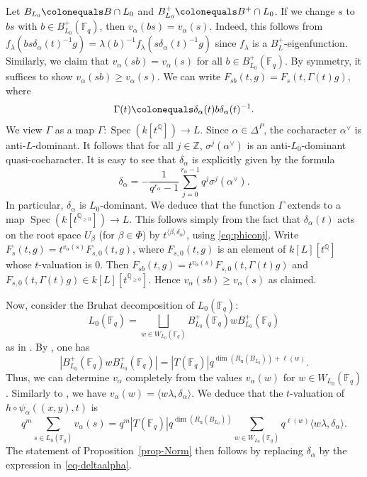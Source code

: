 \documentclass[11pt]{amsart}
\numberwithin{equation}{section}
\theoremstyle{definition}
\theoremstyle{remark}
\newcommand{\FF}{\mathbb{F}}
\newcommand{\QQ}{\mathbb{Q}}
\newcommand{\ZZ}{\mathbb{Z}}
\DeclareMathOperator{\spec}{Spec}
\begin{document}
Let $B_{L_0}\colonequals B\cap L_0$ and $B^+_{L_0}\colonequals B^+\cap L_0$. If we change $s$ to $bs$ with $b\in B^{+}_{L_0}(\FF_q)$, then $v_\alpha(bs)=v_\alpha(s)$. Indeed, this follows from $f_\lambda(bs\delta_\alpha(t)^{-1}g)=\lambda(b)^{-1} f_\lambda(s\delta_\alpha(t)^{-1}g)$ since $f_\lambda$ is a $B^+_L$-eigenfunction. Similarly, we claim that $v_\alpha(sb)=v_\alpha(s)$ for all $b\in B^+_{L_0}(\FF_q)$. By symmetry, it suffices to show $v_\alpha(sb)\geq v_\alpha(s)$. We can write
$F_{sb}(t,g)=F_s(t,\Gamma(t)g)$, where
\begin{equation}
    \Gamma(t)\colonequals
    \delta_\alpha(t) b \delta_\alpha(t)^{-1}.
\end{equation}
We view $\Gamma$ as a map $\Gamma\colon \spec(k[t^\QQ])\to L$. Since $\alpha\in \Delta^P$, the cocharacter $\alpha^\vee$ is anti-$L$-dominant. It follows that for all $j\in \ZZ$, $\sigma^j(\alpha^\vee)$ is an anti-$L_0$-dominant quasi-cocharacter. It is easy to see that $\delta_\alpha$ is explicitly given by the formula
\begin{equation}\label{eq-deltaalpha}
    \delta_\alpha=-\frac{1}{q^{r_\alpha}-1}\sum_{j=0}^{r_\alpha-1}q^j\sigma^j\left(\alpha^\vee\right). 
\end{equation}
In particular, $\delta_\alpha$ is $L_0$-dominant. We deduce that the function $\Gamma$ extends to a map $\spec(k[t^{\QQ_{\geq 0}}])\to L$. This follows simply from the fact that $\delta_\alpha(t)$ acts on the root space $U_\beta$ (for $\beta\in \Phi$) by $t^{\langle \beta,\delta_\alpha \rangle}$, using \eqref{eq:phiconj}. Write $F_s(t,g)=t^{v_\alpha(s)}F_{s,0}(t,g)$, where $F_{s,0}(t,g)$ is an element of $k[L][t^\QQ]$ whose $t$-valuation is $0$. Then $F_{sb}(t,g)=t^{v_\alpha(s)}F_{s,0}(t,\Gamma(t)g)$ and 
$F_{s,0}(t,\Gamma(t)g) \in k[L][t^{\QQ_{\geq 0}}]$. 
Hence $v_\alpha(sb)\geq v_\alpha(s)$ as claimed.

Now, consider the Bruhat decomposition of $L_0(\FF_q)$:
\begin{equation}
    L_0\left(\FF_q\right)=\bigsqcup_{w\in W_{L_0}(\FF_q)} B^+_{L_0}\left(\FF_q\right) w B^+_{L_0}\left(\FF_q\right)
\end{equation}
as in \cite[Lemma 3.4.4]{Koskivirta-automforms-GZip}. By \cite[Lemma 3.4.5]{Koskivirta-automforms-GZip}, one has
\begin{equation}
  \left|B^+_{L_0}\left(\FF_q\right) w B^+_{L_0}\left(\FF_q\right)\right| =  \left|T\left(\FF_q\right)\right|q^{\dim(R_{\mathrm{u}}(B_{L_0}))+\ell(w)}.
\end{equation} 
Thus, we can determine $v_\alpha$ completely from the values $v_\alpha(w)$ for $w\in W_{L_0}(\FF_q)$. Similarly to \cite[Proposition 3.5.2]{Koskivirta-automforms-GZip}, we have $v_\alpha(w)=\langle w\lambda, \delta_\alpha \rangle$. We deduce that the $t$-valuation of $h\circ \psi_\alpha((x,y),t)$ is
\begin{equation}
 q^m\sum_{s\in L_0(\FF_q)} v_\alpha(s) =   q^m \left|T\left(\FF_q\right)\right|q^{\dim(R_{\mathrm{u}}(B_{L_0}))} \sum_{w\in W_{L_0}(\FF_q)} q^{\ell(w)}\langle w\lambda, \delta_\alpha \rangle.
\end{equation}
The statement of Proposition~\ref{prop-Norm} then follows by replacing $\delta_\alpha$ by the expression in \eqref{eq-deltaalpha}.
\end{document}
